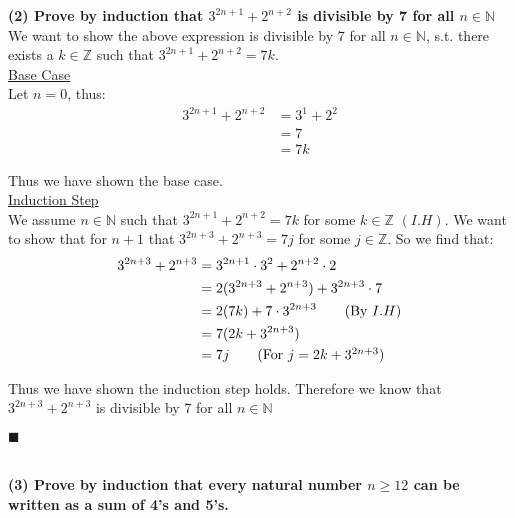 \documentclass[20pt]{article}
\begin{document}
\noindent
\begin{text}
    {\bf (2) Prove by induction that $3^{2n+1} + 2^{n+2}$ is divisible by 7 for all $n \in \mathbb{N}$}\\
    We want to show the above expression is divisible by 7 for all $n \in \mathbb{N}$, s.t. there exists a $k \in \mathbb{Z}$ such that $3^{2n+1} + 2^{n+2} = 7k$.\\
    
    \noindent
    \underline{Base Case}\\
    Let $n = 0$, thus:
    \begin{align}
        3^{2n+1} + 2^{n+2} &= 3^{1} + 2^{2}\nonumber\\
        &= 7\nonumber\\
        &= 7k\tag{For $k = 1$}
    \end{align}
    
    \noindent
    Thus we have shown the base case.\\
    
    \noindent
    \underline{Induction Step}\\
    We assume $n \in \mathbb{N}$ such that $3^{2n+1} + 2^{n+2} = 7k$ for some $k \in \mathbb{Z}$ $(I.H)$. We want to show that for $n+1$ that $3^{2n+3} + 2^{n+3} = 7j$ for some $j \in \mathbb{Z}$. So we find that:
    \begin{align}
        3^{2n+3} + 2^{n+3} &= 3^{2n+1} \cdot 3^{2} + 2^{n+2} \cdot 2\nonumber\\
        &= 2(3^{2n+3} + 2^{n+3}) + 3^{2n+3} \cdot 7\nonumber\\
        &= 2(7k) + 7\cdot3^{2n+3} \tag{By $I.H$}\nonumber\\
        &= 7(2k + 3^{2n+3})\nonumber\nonumber\\
        &= 7j \tag{For $j = 2k + 3^{2n+3}$}
    \end{align}
    
    \noindent
    Thus we have shown the induction step holds. Therefore we know that $3^{2n+3} + 2^{n+3}$ is divisible by 7 for all $n \in \mathbb{N}$
    
    \hfill $\blacksquare$
\end{text}\\
\newpage
\noindent
\textbf{(3) Prove by induction that every natural number $n \geq 12$ can be written as a sum of 4's and 5's.}\\
\end{document}
